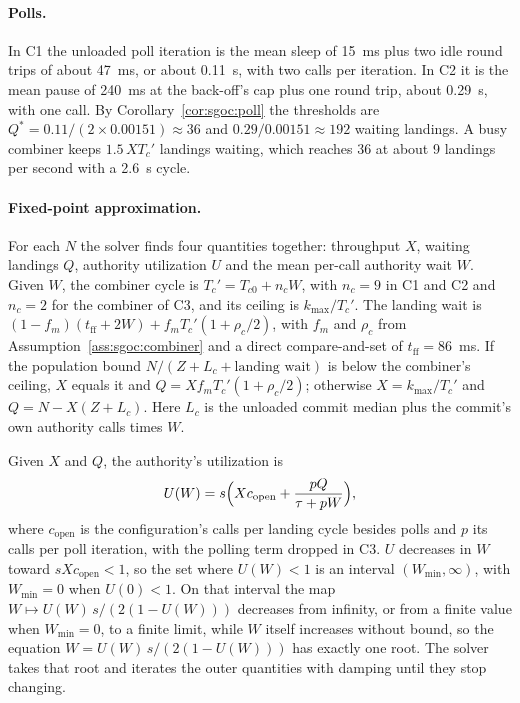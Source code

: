 \documentclass[11pt,letterpaper]{article}
\theoremstyle{definition}
\theoremstyle{remark}
\begin{document}
\paragraph{Polls.} In C1 the unloaded poll iteration is the mean sleep of 15~ms plus two idle round trips of about 47~ms, or about 0.11~s, with two calls per iteration. In C2 it is the mean pause of 240~ms at the back-off's cap plus one round trip, about 0.29~s, with one call. %
By Corollary~\ref{cor:sgoc:poll} the thresholds are $Q^{*} = 0.11/(2 \times 0.00151) \approx 36$ and $0.29/0.00151 \approx 192$ waiting landings. A busy combiner keeps $1.5\,X T_c'$ landings waiting, which reaches 36 at about 9 landings per second with a 2.6~s cycle.

\paragraph{Fixed-point approximation.} For each $N$ the solver finds four quantities together: throughput $X$, waiting landings $Q$, authority utilization $U$ and the mean per-call authority wait $W$. Given $W$, the combiner cycle is $T_c' = T_{c0} + n_c W$, with $n_c = 9$ in C1 and C2 and $n_c = 2$ for the combiner of C3, and its ceiling is $k_{\max}/T_c'$. The landing wait is $(1 - f_m)(t_{\mathrm{ff}} + 2W) + f_m T_c'(1 + \rho_c/2)$, with $f_m$ and $\rho_c$ from Assumption~\ref{ass:sgoc:combiner} and a direct compare-and-set of $t_{\mathrm{ff}} = 86$~ms. %
If the population bound $N/(Z + L_c + \text{landing wait})$ is below the combiner's ceiling, $X$ equals it and $Q = X f_m T_c'(1 + \rho_c/2)$; otherwise $X = k_{\max}/T_c'$ and $Q = N - X(Z + L_c)$. Here $L_c$ is the unloaded commit median plus the commit's own authority calls times $W$.

Given $X$ and $Q$, the authority's utilization is
\begin{equation}
\label{eq:sgoc:util}
U(W) = s\Bigl(X c_{\mathrm{open}} + \frac{pQ}{\tau + pW}\Bigr),
\end{equation}
where $c_{\mathrm{open}}$ is the configuration's calls per landing cycle besides polls and $p$ its calls per poll iteration, with the polling term dropped in C3. $U$ decreases in $W$ toward $s X c_{\mathrm{open}} < 1$, so the set where $U(W) < 1$ is an interval $(W_{\min}, \infty)$, with $W_{\min} = 0$ when $U(0) < 1$. On that interval the map $W \mapsto U(W)\,s/(2(1 - U(W)))$ decreases from infinity, or from a finite value when $W_{\min} = 0$, to a finite limit, while $W$ itself increases without bound, so the equation $W = U(W)\,s/(2(1 - U(W)))$ has exactly one root. The solver takes that root and iterates the outer quantities with damping until they stop changing.
\end{document}
